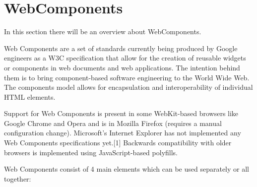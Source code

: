 \section{WebComponents}
\label{sec:TCH_webcomponents}

In this section there will be an overview about WebComponents.

Web Components are a set of standards currently being produced by Google engineers as a W3C specification that allow for the creation of reusable widgets or components in web documents and web applications. The intention behind them is to bring component-based software engineering to the World Wide Web. The components model allows for encapsulation and interoperability of individual HTML elements.

Support for Web Components is present in some WebKit-based browsers like Google Chrome and Opera and is in Mozilla Firefox (requires a manual configuration change). Microsoft's Internet Explorer has not implemented any Web Components specifications yet.[1] Backwards compatibility with older browsers is implemented using JavaScript-based polyfills.

Web Components consist of 4 main elements which can be used separately or all together:

